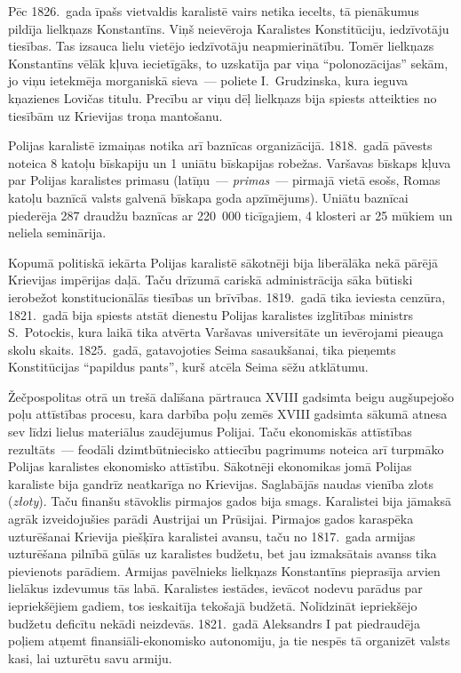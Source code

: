 \documentclass[twoside,a5paper,12pt,fleqn,openany]{extbook}
\newcommand{\pltxti}[1]{\textit{\textpolish{#1}}}
\newcommand{\latxti}[1]{\textit{\textlatin{#1}}}
\begin{document}
Pēc 1826.~gada īpašs vietvaldis karalistē vairs netika iecelts, tā pienākumus pildīja lielkņazs Konstantīns. Viņš neievēroja Karalistes Konstitūciju, iedzīvotāju tiesības. Tas izsauca lielu vietējo iedzīvotāju neapmierinātību. Tomēr lielkņazs Konstantīns vēlāk kļuva iecietīgāks, to uzskatīja par viņa ``polonozācijas'' sekām, jo viņu ietekmēja morganiskā sieva~--- poliete I.~Grudzinska, kura ieguva kņazienes Lovičas titulu. Precību ar viņu dēļ lielkņazs bija spiests atteikties no tiesībām uz Krievijas troņa mantošanu.

Polijas karalistē izmaiņas notika arī baznīcas organizācijā. 1818.~gadā pāvests noteica 8 katoļu bīskapiju un 1 uniātu bīskapijas robežas. Varšavas bīskaps kļuva par Polijas karalistes primasu (latīņu~--- \latxti{primas}~--- pirmajā vietā esošs, Romas katoļu baznīcā valsts galvenā bīskapa goda apzīmējums). Uniātu baznīcai piederēja 287 draudžu baznīcas ar 220~000 ticīgajiem, 4 klosteri ar 25 mūkiem un neliela seminārija.

Kopumā politiskā iekārta Polijas karalistē sākotnēji bija liberālāka nekā pārējā Krievijas impērijas daļā. Taču drīzumā cariskā administrācija sāka būtiski ierobežot konstitucionālās tiesības un brīvības. 1819.~gadā tika ieviesta cenzūra, 1821.~gadā bija spiests atstāt dienestu Polijas karalistes izglītības ministrs S.~Potockis, kura laikā tika atvērta Varšavas universitāte un ievērojami pieauga skolu skaits. 1825.~gadā, gatavojoties Seima sasaukšanai, tika pieņemts Konstitūcijas ``papildus pants'', kurš atcēla Seima sēžu atklātumu.

Žečpospolitas otrā un trešā dalīšana pārtrauca XVIII gadsimta beigu augšupejošo poļu  attīstības procesu, kara darbība poļu zemēs XVIII gadsimta sākumā atnesa sev līdzi lielus materiālus zaudējumus Polijai. Taču ekonomiskās attīstības rezultāts~--- feodāli dzimtbūtniecisko attiecību pagrimums noteica arī turpmāko Polijas karalistes ekonomisko attīstību. Sākotnēji ekonomikas jomā Polijas karaliste bija gandrīz neatkarīga no Krievijas. Saglabājās naudas vienība zlots (\pltxti{złoty}). Taču finanšu stāvoklis pirmajos gados bija smags. Karalistei bija jāmaksā agrāk izveidojušies parādi Austrijai un Prūsijai. Pirmajos gados karaspēka uzturēšanai Krievija piešķīra karalistei avansu, taču no 1817.~gada armijas uzturēšana pilnībā gūlās uz karalistes budžetu, bet jau izmaksātais avanss tika pievienots parādiem. Armijas pavēlnieks lielkņazs Konstantīns pieprasīja arvien lielākus izdevumus tās labā. Karalistes iestādes, ievācot nodevu parādus par iepriekšējiem gadiem, tos ieskaitīja tekošajā budžetā. Nolīdzināt iepriekšējo budžetu deficītu nekādi neizdevās. 1821.~gadā Aleksandrs I pat piedraudēja poļiem atņemt finansiāli-ekonomisko autonomiju, ja tie nespēs tā organizēt valsts kasi, lai uzturētu savu armiju.
\end{document}
